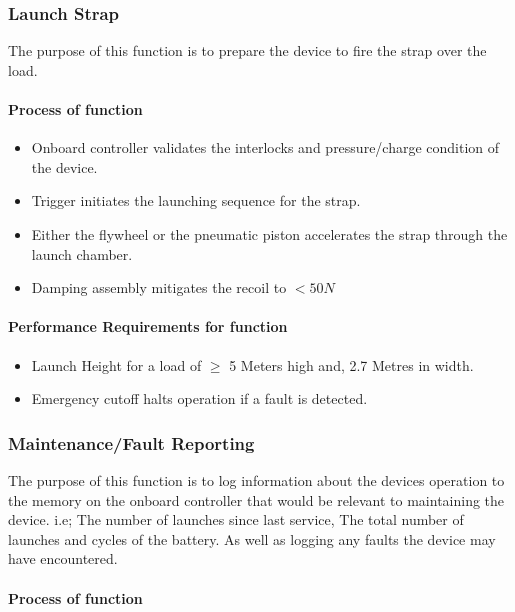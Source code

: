 \documentclass[a4paper,10pt]{article} %
\begin{document}
\subsubsection{Launch Strap}

The purpose of this function is to prepare the device to fire the strap over the load. 

\paragraph{Process of function}


\begin{itemize}
    \item Onboard controller validates the interlocks and pressure/charge condition of the device.
    \item Trigger initiates the launching sequence for the strap.
    \item Either the flywheel or the pneumatic piston accelerates the strap through the launch chamber.
    \item Damping assembly mitigates the recoil to $< 50N$
\end{itemize}

\paragraph{Performance Requirements for function}

\begin{itemize}
    \item Launch Height for a load of $\geq$ 5 Meters high and, 2.7 Metres in width.
    \item Emergency cutoff halts operation if a fault is detected.
\end{itemize}

\newpage

\subsubsection{Maintenance/Fault Reporting}

The purpose of this function is to log information about the devices operation to the memory on the onboard controller that would be relevant to maintaining the device. i.e; The number of launches since last service, The total number of launches and cycles of the battery. As well as logging any faults the device may have encountered.

\paragraph{Process of function}
\end{document}
